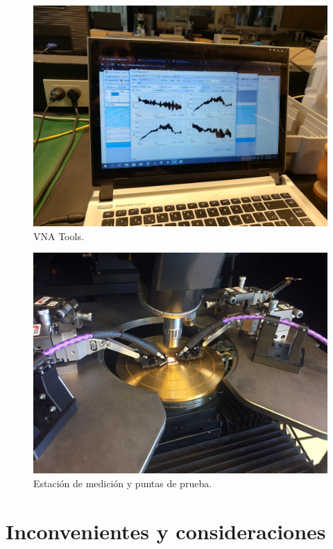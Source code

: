 \documentclass[10pt, a4paper, twocolumn]{article}
\begin{document}
\begin{figure}[hbt!]
	\includegraphics[width=\linewidth]{Fotos/Med_3.jpeg}
	\caption{VNA Tools.}
\end{figure}

\begin{figure}[hbt!]
	\includegraphics[width=\linewidth]{Fotos/Med_4.jpg}
	\caption{Estación de medición y puntas de prueba.}
\end{figure}

\section{Inconvenientes y consideraciones}
\end{document}
